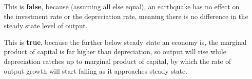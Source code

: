\documentclass[8pt]{extarticle}
\begin{document}
\begin{solution}
  \begin{tcolorbox}[colback = white, title = (a)]
    This is \textbf{false}, because (assuming all else equal), an earthquake has no effect on the investment rate or the depreciation rate, meaning there is no difference in the steady state level of output.
  \end{tcolorbox}
  \begin{tcolorbox}[colback = white, title = (b)]
    This is \textbf{true}, because the further below steady state an economy is, the marginal product of capital is far higher than depreciation, so output will rise while depreciation catches up to marginal product of capital, by which the rate of output growth will start falling as it approaches steady state.
  \end{tcolorbox}
\end{solution}
\end{document}

